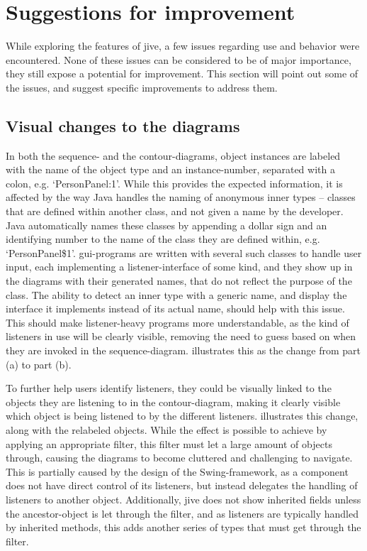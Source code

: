 \section{Suggestions for improvement}\label{jiveSuggestions}

While exploring the features of \gls{jive}, a few issues regarding use and behavior were encountered.
None of these issues can be considered to be of major importance, they still expose a potential for improvement.
This section will point out some of the issues, and suggest specific improvements to address them.

\subsection{Visual changes to the diagrams}\label{jiveSuggestionsVisual}
In both the sequence- and the contour-diagrams, object instances are labeled with the name of the object type and an instance-number, separated with a colon, e.g. `PersonPanel:1'.
While this provides the expected information, it is affected by the way Java handles the naming of anonymous inner types -- classes that are defined within another class, and not given a name by the developer.
Java automatically names these classes by appending a dollar sign and an identifying number to the name of the class they are defined within, e.g. `PersonPanel\$1'.
\gls{gui}-programs are written with several such classes to handle user input, each implementing a listener-interface of some kind, and they show up in the diagrams with their generated names, that do not reflect the purpose of the class.
The ability to detect an inner type with a generic name, and display the interface it implements instead of its actual name, should help with this issue.
This should make listener-heavy programs more understandable, as the kind of listeners in use will be clearly visible, removing the need to guess based on when they are invoked in the sequence-diagram.
 illustrates this as the change from part (a) to part (b).

To further help users identify listeners, they could be visually linked to the objects they are listening to in the contour-diagram, making it clearly visible which object is being listened to by the different listeners.
 illustrates this change, along with the relabeled objects.
While the effect is possible to achieve by applying an appropriate filter, this filter must let a large amount of objects through, causing the diagrams to become cluttered and challenging to navigate.
This is partially caused by the design of the Swing-framework, as a component does not have direct control of its listeners, but instead delegates the handling of listeners to another object.
Additionally, \gls{jive} does not show inherited fields unless the ancestor-object is let through the filter, and as listeners are typically handled by inherited methods, this adds another series of types that must get through the filter.

